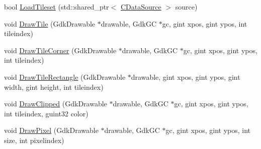 \begin{DoxyCompactItemize}
bool \hyperlink{classCGraphicTileset_a7d47754f26f03958be28a064f54eef1d}{Load\+Tileset} (std\+::shared\+\_\+ptr$<$ \hyperlink{classCDataSource}{C\+Data\+Source} $>$ source)
\item 
void \hyperlink{classCGraphicTileset_afefd501a74e95295b7cd2dc868dcbbcb}{Draw\+Tile} (Gdk\+Drawable $\ast$drawable, Gdk\+GC $\ast$gc, gint xpos, gint ypos, int tileindex)
\item 
void \hyperlink{classCGraphicTileset_abf87dd71c8bf50b8878c66a5bdb2c7e7}{Draw\+Tile\+Corner} (Gdk\+Drawable $\ast$drawable, Gdk\+GC $\ast$gc, gint xpos, gint ypos, int tileindex)
\item 
void \hyperlink{classCGraphicTileset_a81114be934d1efca29eb194fc2429658}{Draw\+Tile\+Rectangle} (Gdk\+Drawable $\ast$drawable, gint xpos, gint ypos, gint width, gint height, int tileindex)
\item 
void \hyperlink{classCGraphicTileset_a104935351be4c465f3ff08c111455d19}{Draw\+Clipped} (Gdk\+Drawable $\ast$drawable, Gdk\+GC $\ast$gc, gint xpos, gint ypos, int tileindex, guint32 color)
\item 
void \hyperlink{classCGraphicTileset_a8acad7ebeb4fad53a72681851f323812}{Draw\+Pixel} (Gdk\+Drawable $\ast$drawable, Gdk\+GC $\ast$gc, gint xpos, gint ypos, int size, int pixelindex)
\end{DoxyCompactItemize}

